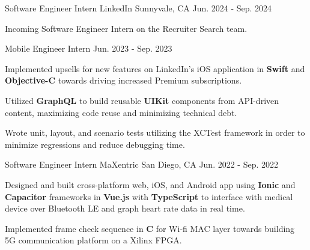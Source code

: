 

\begin{cventries}

\cventrytwo
  {Software Engineer Intern} %
  {LinkedIn} %
  {Sunnyvale, CA} %
  {Jun. 2024 - Sep. 2024} %
  {
    \begin{cvitems} %
      \item {Incoming Software Engineer Intern on the Recruiter Search team.}
    \end{cvitems}
  }
  {Mobile Engineer Intern} %
  {Jun. 2023 - Sep. 2023} %
  {
    \begin{cvitems} %
      \item {Implemented upsells for new features on LinkedIn’s iOS application in \textbf{Swift} and \textbf{Objective-C} towards driving increased Premium subscriptions. }
      \item {Utilized \textbf{GraphQL} to build reusable \textbf{UIKit} components from API-driven content, maximizing code reuse and minimizing technical debt.}
      \item {Wrote unit, layout, and scenario tests utilizing the XCTest framework in order to minimize regressions and reduce debugging time.}
    \end{cvitems}
  } %


\cventry
  {Software Engineer Intern} %
  {MaXentric} %
  {San Diego, CA} %
  {Jun. 2022 - Sep. 2022} %
  {
    \begin{cvitems} %
      \item {Designed and built cross-platform web, iOS, and Android app using \textbf{Ionic} and \textbf{Capacitor} frameworks in \textbf{Vue.js} with \textbf{TypeScript} to interface with medical device over Bluetooth LE and graph heart rate data in real time.}
      \item {Implemented frame check sequence in \textbf{C} for Wi‐fi MAC layer towards building 5G communication platform on a Xilinx FPGA.}
    \end{cvitems}
  }



\end{cventries}
